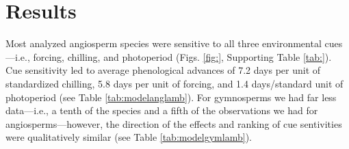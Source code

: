 \documentclass{article}\usepackage[]{graphicx}\usepackage[]{color}
\begin{document}





\section*{Results}
Most analyzed angiosperm species were sensitive to all three environmental cues---i.e., forcing, chilling, and photoperiod (Figs. \ref{fig:}, Supporting Table \ref{tab:}). Cue sensitivity led to average phenological advances of 7.2 days per unit of standardized chilling, 5.8 days per unit of forcing, and 1.4 days/standard unit of photoperiod (see Table \ref{tab:modelanglamb}). For gymnosperms we had far less data---i.e., a tenth of the species and a fifth of the observations we had for angiosperms---however, the direction of the effects and ranking of cue sentivities were qualitatively similar (see Table \ref{tab:modelgymlamb}).\\ %
\end{document}
